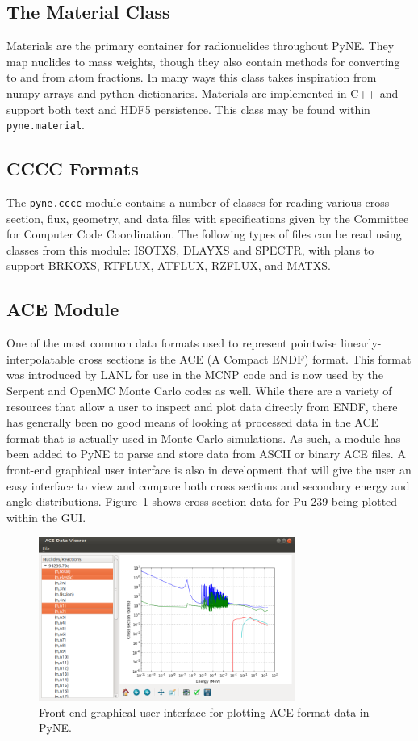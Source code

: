 \documentclass{anstrans}
\begin{document}
\subsection{The Material Class} 
Materials are the primary container for radionuclides throughout PyNE. They map 
nuclides to mass weights, though they also contain methods for converting to and from 
atom fractions.  In many ways this class takes inspiration from numpy arrays 
and python dictionaries.  Materials are implemented in C++ and support both text
and HDF5 persistence.  This class may be found within \texttt{pyne.material}.


\subsection{CCCC Formats}
The \texttt{pyne.cccc} module contains a number of classes for reading various cross section, 
flux, geometry, and data files with specifications given by the Committee for 
Computer Code Coordination. The following types of files can be read using 
classes from this module: ISOTXS, DLAYXS 
and SPECTR, with plans to support BRKOXS, RTFLUX, ATFLUX, RZFLUX, and MATXS.

\subsection{ACE Module}

One of the most common data formats used to represent pointwise
linearly-interpolatable cross sections is the ACE (A Compact ENDF) format. This
format was introduced by LANL for use in the MCNP \cite{mcnp} code and is now
used by the Serpent \cite{serpent} and OpenMC \cite{openmc} Monte Carlo codes as
well. While there are a variety of resources that allow a user to inspect and
plot data directly from ENDF, there has generally been no good means of looking
at processed data in the ACE format that is actually used in Monte Carlo
simulations. As such, a module has been added to PyNE to parse and store data
from ASCII or binary ACE files. A front-end graphical user interface is also in
development that will give the user an easy interface to view and compare both
cross sections and secondary energy and angle
distributions. Figure~\ref{fig:ace-gui} shows cross section data for Pu-239
being plotted within the GUI.
\begin{figure}[ht]
  \centering
  \includegraphics[width=3.3in]{ace-gui.png}
  \caption{Front-end graphical user interface for plotting ACE format data in
    PyNE.}
  \label{fig:ace-gui}
\end{figure}
\end{document}
